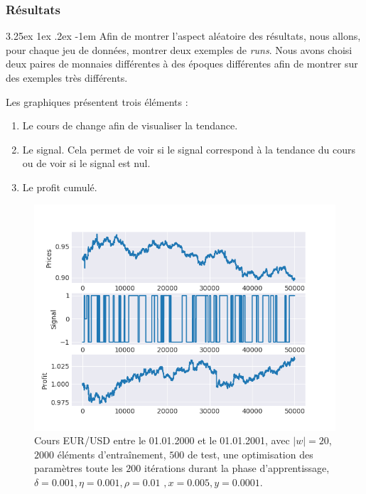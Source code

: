 \documentclass[a4paper, 11pt]{article}
\makeatletter
\renewcommand\paragraph{\@startsection{paragraph}{5}{\z@}%
  {3.25ex \@plus1ex \@minus.2ex}%
  {-1em}%
  {\normalfont\normalsize\bfseries}}
\makeatother
\begin{document}
\subsubsection{Résultats}
 \paragraph{}
 Afin de montrer l'aspect aléatoire des résultats, nous allons, pour chaque jeu de données, montrer deux exemples de \textit{runs}. Nous avons choisi 
 deux paires de monnaies différentes à des époques différentes afin de montrer sur des exemples très différents.
 
 Les graphiques présentent trois éléments :
 \begin{enumerate}
  \item Le cours de change afin de visualiser la tendance.
  \item Le signal. Cela permet de voir si le signal correspond à la tendance du cours ou de voir si le signal est nul.
  \item Le profit cumulé.
 \end{enumerate}


 
 \begin{figure}[H]
\centering
\includegraphics[]{images/res/eurusd_2000_2001_1.png}
\caption[Blup]{Cours EUR/USD entre le 01.01.2000 et le 01.01.2001, avec $|w| = 20$, $2000$ éléments d'entraînement, $500$ de test, une optimisation des
paramètres toute les $200$ itérations durant la phase d'apprentissage, $\delta = 0.001, \eta=0.001,\rho=0.01$
\footnotemark$, x = 0.005, y=0.0001$.}
\end{figure}
\end{document}
